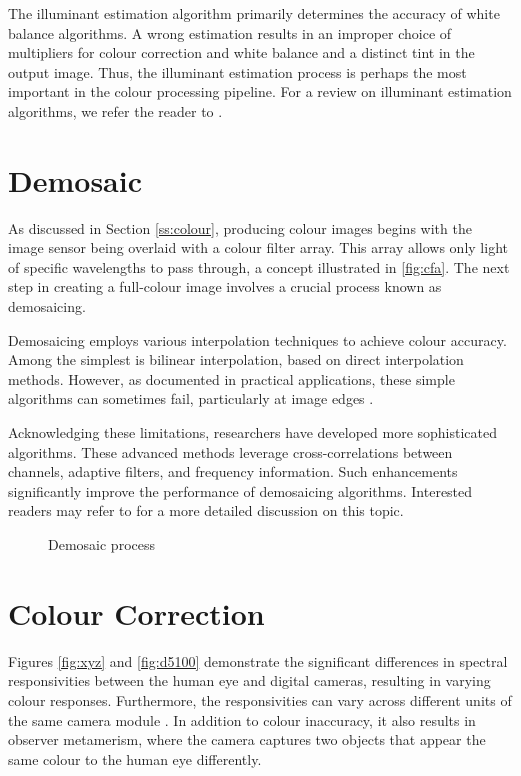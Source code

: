 The illuminant estimation algorithm primarily determines the accuracy of white balance algorithms. A wrong estimation results in an improper choice of multipliers for colour correction and white balance and a distinct tint in the output image. Thus, the illuminant estimation process is perhaps the most important in the colour processing pipeline. For a review on illuminant estimation algorithms, we refer the reader to \cite{colourconstancy}.

\section{Demosaic}

As discussed in Section \ref{ss:colour}, producing colour images begins with the image sensor being overlaid with a colour filter array. This array allows only light of specific wavelengths to pass through, a concept illustrated in \ref{fig:cfa}. The next step in creating a full-colour image involves a crucial process known as demosaicing.

Demosaicing employs various interpolation techniques to achieve colour accuracy. Among the simplest is bilinear interpolation, based on direct interpolation methods. However, as documented in practical applications, these simple algorithms can sometimes fail, particularly at image edges \cite[46]{Ramanath}.

Acknowledging these limitations, researchers have developed more sophisticated algorithms. These advanced methods leverage cross-correlations between channels, adaptive filters, and frequency information. Such enhancements significantly improve the performance of demosaicing algorithms. Interested readers may refer to \cite{gunturk2005demosaicking} for a more detailed discussion on this topic.


\begin{figure}
    \centering
    \caption{Demosaic process \cite{demosaic}}
    \label{fig:demosaic}
\end{figure}

\section{Colour Correction}
 \label{ss:cc}
Figures \ref{fig:xyz} and \ref{fig:d5100} demonstrate the significant differences in spectral responsivities between the human eye and digital cameras, resulting in varying colour responses. Furthermore, the responsivities can vary across different units of the same camera module \cite{walowit2019best}. In addition to colour inaccuracy, it also results in observer metamerism, where the camera captures two objects that appear the same colour to the human eye differently.

